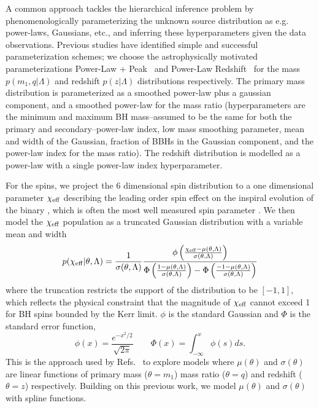\documentclass[%
 reprint,
 amsmath,amssymb,
 aps,
 prd,
]{revtex4-2}
\newcommand{\chieff}{\chi_{\rm eff}}
\newcommand{\beq}{\begin{equation}}
\newcommand{\eeq}{\end{equation}}
\newcommand{\pp}{{\sc Power-Law + Peak}}
\newcommand{\pr}{{\sc Power-Law Redshift}}
\begin{document}
A common approach tackles %
the hierarchical inference problem by phenomenologically parameterizing the unknown source distribution as e.g. power-laws, Gaussians, etc., and inferring these hyperparameters given the data observations. Previous studies have identified simple and successful parameterization schemes; we choose the astrophysically motivated parameterizations \pp~\cite{Talbot:2018cva}
and \pr~\cite{Fishbach:2018edt} for the mass $p(m_1, q|\Lambda)$ and redshift $p(z|\Lambda)$ distributions respectively. The primary mass distribution is parameterized as a smoothed power-law plus a gaussian component, and a smoothed power-law for the mass ratio (hyperparameters are the minimum and maximum BH mass--assumed to be the same for both the primary and secondary--power-law index, low mass smoothing parameter, mean and width of the Gaussian, fraction of BBHs in the Gaussian component, and the power-law index for the mass ratio). The redshift distribution is modelled as a power-law with a single power-law index hyperparameter. 

For the spins, we project the 6 dimensional spin distribution to a one dimensional parameter $\chieff$ describing the leading order spin effect on the inspiral evolution of the binary \cite{Damour:2001,Racine:2008qv,Ajith:2009bn}, which is often the most well measured spin parameter \cite{Vitale:2016avz, Purrer:2015nkh}. 
We then model the $\chieff$ population as a truncated Gaussian distribution with a variable mean and width~\cite{Miller:2020zox, Roulet:2018jbe}
\beq 
p(\chieff|\theta, \Lambda) = \frac{1}{\sigma(\theta, \Lambda)}\frac{\phi\left(\frac{\chieff - \mu(\theta, \Lambda)}{\sigma(\theta, \Lambda)}\right)}{\Phi\left(\frac{1-\mu(\theta, \Lambda)}{\sigma(\theta, \Lambda)}\right) - \Phi\left(\frac{-1-\mu(\theta, \Lambda)}{\sigma(\theta, \Lambda)}\right)}
\label{eq:general_chieff_correlation}
\eeq
where the truncation restricts the support of the distribution to be $[-1,1]$, which reflects the physical constraint that the magnitude of $\chieff$ cannot exceed 1 for BH spins bounded by the Kerr limit. $\phi$ is the standard Gaussian and $\Phi$ is the standard error function, 
\beq
\phi(x) = \frac{e^{-x^2/2}}{\sqrt{2\pi}} \qquad \Phi(x) = \int_{-\infty}^x \phi(s)ds.
\label{eq:standard_gaus}
\eeq
This is the approach used by Refs.~\cite{KAGRA:2021duu,Safarzadeh:2020mlb,Callister:2021fpo,Biscoveanu:2022qac} to explore models where $\mu(\theta)$ and $\sigma(\theta)$ are linear functions of primary mass ($\theta = m_1$) mass ratio ($\theta = q$) and redshift ($\theta = z$) respectively. Building on this previous work, we model $\mu(\theta)$ and $\sigma(\theta)$ with spline functions.
\end{document}
